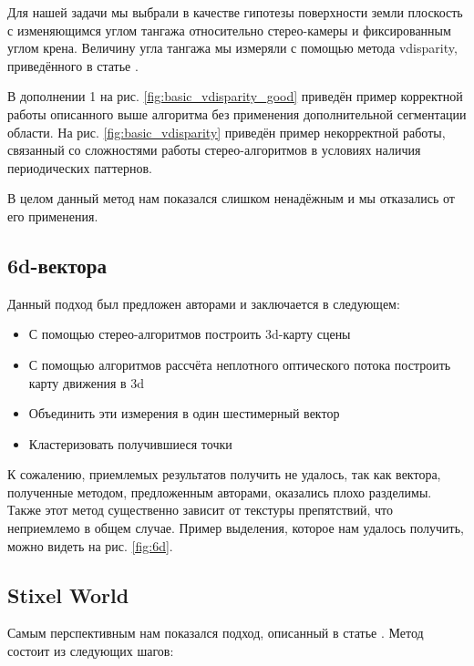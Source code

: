 \documentclass[aps,%
14pt,%
final,%
oneside,
onecolumn,%
musixtex, %
superscriptaddress,%
centertags]{extarticle} %
\begin{document}
Для нашей задачи мы выбрали в качестве гипотезы поверхности земли плоскость с изменяющимся углом тангажа относительно стерео-камеры и фиксированным углом крена. Величину угла тангажа мы измеряли с помощью метода vdisparity, приведённого в статье \cite{labayrade2002real}.

В дополнении 1 на рис. \ref{fig:basic_vdisparity_good} приведён пример корректной работы описанного выше алгоритма без применения дополнительной сегментации области. На рис. \ref{fig:basic_vdisparity} приведён пример некорректной работы, связанный со сложностями работы стерео-алгоритмов в условиях наличия периодических паттернов. 

В целом данный метод нам показался слишком ненадёжным и мы отказались от его применения.

\subsection{ 6d-вектора }

Данный подход был предложен авторами \cite{franke20056d} и заключается в следующем:
\begin{itemize}
     \item С помощью стерео-алгоритмов построить 3d-карту сцены
     \item С помощью алгоритмов рассчёта неплотного оптического потока построить карту движения в 3d
     \item Объединить эти измерения в один шестимерный вектор
     \item Кластеризовать получившиеся точки
\end{itemize}

К сожалению, приемлемых результатов получить не удалось, так как вектора, полученные методом, предложенным авторами, оказались плохо разделимы. Также этот метод существенно зависит от текстуры препятствий, что неприемлемо в общем случае. Пример выделения, которое нам удалось получить, можно видеть на рис. \ref{fig:6d}.

\subsection{ Stixel World }

Самым перспективным нам показался подход, описанный в статье \cite{pfeiffer2010efficient}. Метод состоит из следующих шагов:
\end{document}
